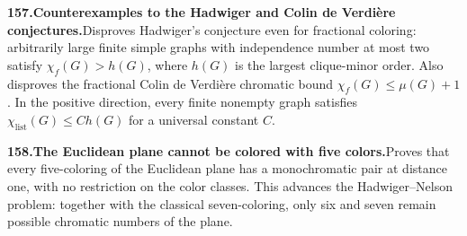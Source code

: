 \documentclass[11pt,a4paper]{article}
\begin{document}
  \par \begin{minipage}{\linewidth}
  \fontsize{10.5}{12.6}\selectfont\RaggedRight
  \hypertarget{result 157}{}
  {\bfseries\textcolor{muted}{157.}\enspace Counterexamples to the Hadwiger and Colin de Verdi\`ere conjectures.}\enspace Disproves Hadwiger's conjecture even for fractional coloring: arbitrarily large finite simple graphs with independence number at most two satisfy $\chi_f(G)>h(G)$, where $h(G)$ is the largest clique-minor order. Also disproves the fractional Colin de Verdi\`ere chromatic bound $\chi_f(G)\le\mu(G)+1$. In the positive direction, every finite nonempty graph satisfies $\chi_{\mathrm{list}}(G)\le C h(G)$ for a universal constant $C$.\par
  \end{minipage}\par\vspace{5pt}



  \par \begin{minipage}{\linewidth}
  \fontsize{10.5}{12.6}\selectfont\RaggedRight
  \hypertarget{result 158}{}
  {\bfseries\textcolor{muted}{158.}\enspace The Euclidean plane cannot be colored with five colors.}\enspace Proves that every five-coloring of the Euclidean plane has a monochromatic pair at distance one, with no restriction on the color classes. This advances the Hadwiger--Nelson problem: together with the classical seven-coloring, only six and seven remain possible chromatic numbers of the plane.\par
  \end{minipage}\par\vspace{5pt}
\end{document}
